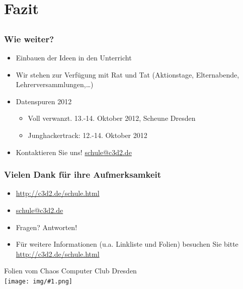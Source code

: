 \documentclass[14pt,handout]{beamer}
\newcommand{\cc}[1]{\texttt{[image: img/\#1.png]}}
\begin{document}
\section{Fazit}
\subsection{}

\begin{frame}
    \frametitle{Wie weiter?}
    \begin{itemize}
        \item<2-> Einbauen der Ideen in den Unterricht
        \item<3-> Wir stehen zur Verfügung mit Rat und Tat (Aktionstage, Elternabende, Lehrerversammlungen,\ldots)
        \item<4-> Datenspuren 2012
            \begin{itemize}
                \item Voll verwanzt. 13.-14. Oktober 2012, Scheune Dresden
                \item Junghackertrack: 12.-14. Oktober 2012
            \end{itemize}
        \item<6-> Kontaktieren Sie uns! \url{schule@c3d2.de}
    \end{itemize}
\end{frame}

\begin{frame}
    \frametitle{Vielen Dank für ihre Aufmerksamkeit}
    \begin{itemize}
        \item \url{http://c3d2.de/schule.html}
        \item \url{schule@c3d2.de}
        \item Fragen? Antworten!
        \item Für weitere Informationen (u.a. Linkliste und Folien) besuchen Sie bitte \url{http://c3d2.de/schule.html}
    \end{itemize}
    \begin{center}
   Folien vom Chaos Computer Club Dresden\\
   {\cc{by-sa}}
   \end{center}
\end{frame}
\end{document}
